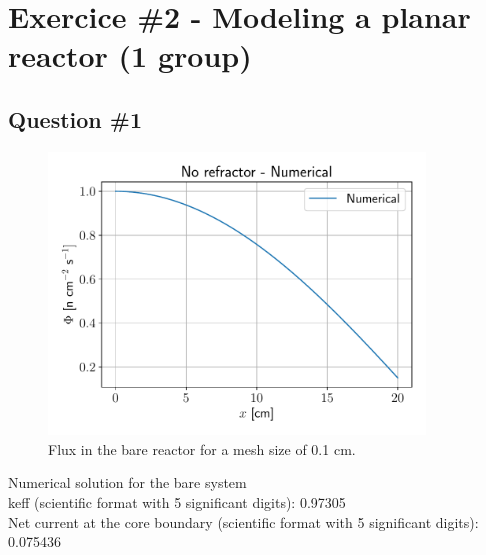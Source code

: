 \documentclass[11pt,a4paper]{article}
\begin{document}

\newpage
\section{Exercice \#2 - Modeling a planar reactor (1 group)}

\subsection{Question \#1}
\begin{figure}[H]
	\includegraphics[width=10cm]{fig/Ex2_Q1.pdf}
	\centering
	\caption{Flux in the bare reactor for a mesh size of 0.1 cm.}
\end{figure}
Numerical solution for the bare system \\
keff (scientific format with 5 significant digits): 0.97305 \\
Net current at the core boundary (scientific format with 5 significant digits): 0.075436 \\
\end{document}
